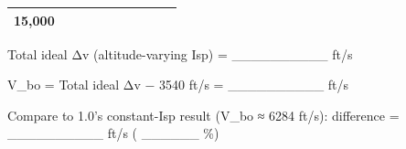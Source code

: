 \documentclass[
  10pt,
]{article}
\begin{document}
\begin{longtable}[]{@{}llllllllll@{}}
\begin{minipage}[t]{0.04\columnwidth}
15,000\strut
\end{minipage} & \begin{minipage}[t]{0.10\columnwidth}\raggedright
\strut
\end{minipage} & \begin{minipage}[t]{0.09\columnwidth}\raggedright
\strut
\end{minipage} & \begin{minipage}[t]{0.11\columnwidth}\raggedright
\strut
\end{minipage}\tabularnewline
\bottomrule
\end{longtable}

Total ideal Δv (altitude-varying Isp) = \_\_\_\_\_\_\_\_\_\_ ft/s

V\_bo = Total ideal Δv − 3540 ft/s = \_\_\_\_\_\_\_\_\_\_ ft/s

Compare to 1.0's constant-Isp result (V\_bo ≈ 6284 ft/s): difference =
\_\_\_\_\_\_\_\_\_\_ ft/s ( \_\_\_\_\_\_ \%)
\end{document}
